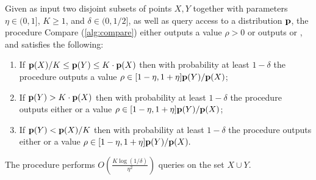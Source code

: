 \begin{lemma}\label{lem:compare}
Given as input
two disjoint subsets of points $X,Y$ together with parameters
$\eta \in (0,1]$, $K \geq 1$, and $\delta\in (0,1/2]$,
as well as \COND query access to a distribution $\mathbf{p}$,
the procedure
{\sc Compare} (\cref{alg:compare})
either outputs a value $\rho > 0$ or
outputs \high or \low, and satisfies the following:
\begin{enumerate}

\item\label{compare:mid}
If $\mathbf{p}(X)/K \leq \mathbf{p}(Y) \leq K \cdot \mathbf{p}(X)$ then with probability
at least $1-\delta$
the procedure outputs a value $\rho \in [1-\eta,1+\eta]\mathbf{p}(Y)/\mathbf{p}(X)$;

\item\label{compare:high}
If $\mathbf{p}(Y) > K \cdot \mathbf{p}(X)$ then with probability at least
$1-\delta$ the procedure outputs
either \high or a value $\rho \in [1-\eta,1+\eta]\mathbf{p}(Y)/\mathbf{p}(X)$;

\item\label{compare:low}
If $\mathbf{p}(Y) < \mathbf{p}(X)/K$ then with probability at least $1-\delta$ the procedure
outputs either \low or a value $\rho \in [1-\eta,1+\eta]\mathbf{p}(Y)/\mathbf{p}(X).$

\end{enumerate}
The procedure performs $O\!\left(\frac{K\log(1/\delta)}{\eta^2}\right)$
\COND queries on the set $X\cup Y$.
\end{lemma}

